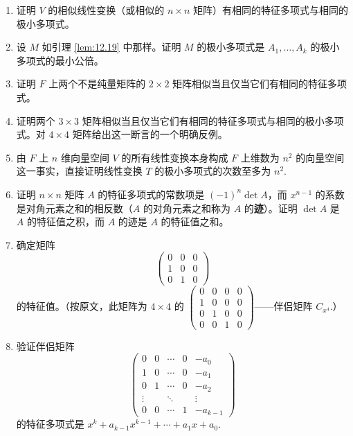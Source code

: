 \begin{enumerate}
\item 证明 \(V\) 的相似线性变换（或相似的 \(n \times n\) 矩阵）有相同的特征多项式与相同的极小多项式。

\item 设 \(M\) 如引理 \ref{lem:12.19} 中那样。证明 \(M\) 的极小多项式是 \(A_1, \ldots, A_k\) 的极小多项式的最小公倍。

\item 证明 \(F\) 上两个不是纯量矩阵的 \(2 \times 2\) 矩阵相似当且仅当它们有相同的特征多项式。

\item 证明两个 \(3 \times 3\) 矩阵相似当且仅当它们有相同的特征多项式与相同的极小多项式。对 \(4 \times 4\) 矩阵给出这一断言的一个明确反例。

\item 由 \(F\) 上 \(n\) 维向量空间 \(V\) 的所有线性变换本身构成 \(F\) 上维数为 \(n^2\) 的向量空间这一事实，直接证明线性变换 \(T\) 的极小多项式的次数至多为 \(n^2\).

\item 证明 \(n \times n\) 矩阵 \(A\) 的特征多项式的常数项是 \((-1)^n\det A\)，而 \(x^{n-1}\) 的系数是对角元素之和的相反数（\(A\) 的对角元素之和称为 \(A\) 的\textbf{迹}）。证明 \(\det A\) 是 \(A\) 的特征值之积，而 \(A\) 的迹是 \(A\) 的特征值之和。

\item 确定矩阵
\[
\begin{pmatrix} 0 & 0 & 0 \\ 1 & 0 & 0 \\ 0 & 1 & 0 \end{pmatrix}
\]
的特征值。（按原文，此矩阵为 \(4 \times 4\) 的 \(\begin{pmatrix}0&0&0&0\\1&0&0&0\\0&1&0&0\\0&0&1&0\end{pmatrix}\)——伴侣矩阵 \(C_{x^4}\).）

\item 验证伴侣矩阵
\[
\begin{pmatrix} 0 & 0 & \cdots & 0 & -a_0 \\ 1 & 0 & \cdots & 0 & -a_1 \\ 0 & 1 & \cdots & 0 & -a_2 \\ \vdots & & \ddots & & \vdots \\ 0 & 0 & \cdots & 1 & -a_{k-1} \end{pmatrix}
\]
的特征多项式是 \(x^k+a_{k-1}x^{k-1}+\cdots+a_1x+a_0\).


\end{enumerate}
